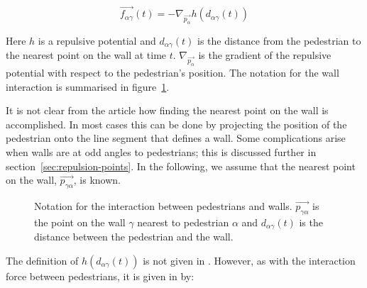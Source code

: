 \begin{equation}\label{wallpotential}
    \overrightarrow{f_{\alpha \gamma}}(t) =
    - \nabla_{\overrightarrow{p_{\alpha}}} h
    \left( d_{\alpha \gamma}(t) \right)
\end{equation}

Here $h$ is a repulsive potential and $d_{\alpha \gamma}(t)$ is the distance 
from the pedestrian to the nearest point on the wall at time $t$. 
$\nabla_{\overrightarrow{p_\alpha}}$ is the gradient of the repulsive 
potential with respect to the pedestrian's position. The notation for the wall 
interaction is summarised in figure~\ref{fig:wall-notation}.

It is not clear from the article how finding the nearest point on the wall is 
accomplished. In most cases this can be done by projecting the position of the 
pedestrian onto the line segment that defines a wall. Some complications 
arise when walls are at odd angles to pedestrians; this is discussed further 
in section~\ref{sec:repulsion-points}. In the following, we assume that the 
nearest point on the wall, $\overrightarrow{p_{\gamma \alpha}}$, is known.

\begin{figure}[ht]
    \centering
    \caption[Notation for the interaction between pedestrians and 
    walls]{Notation for the interaction between pedestrians and walls.  
    $\overrightarrow{p_{\gamma \alpha}}$ is the point on the wall $\gamma$ nearest to pedestrian 
    $\alpha$ and  $d_{\alpha \gamma}(t)$ is the distance between the 
    pedestrian and the wall.}
    \label{fig:wall-notation}
\end{figure}

The definition of $h\left( d_{\alpha \gamma}(t) \right)$ is not given in 
\cite{self-org}. However, as with the interaction force between pedestrians, 
it is given in \cite{ABconstant} by: 

